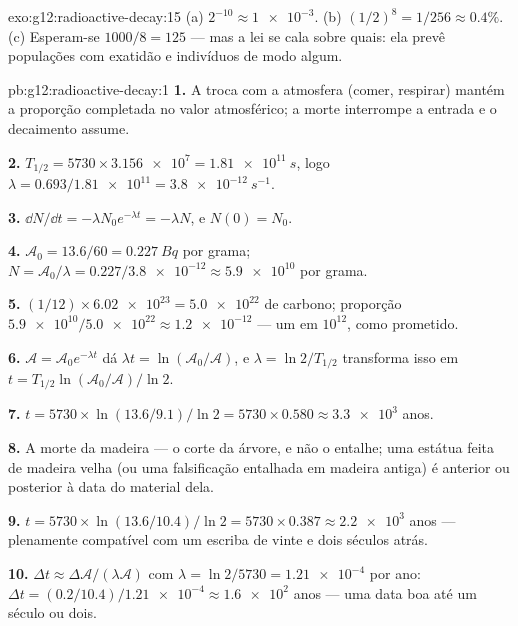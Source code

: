 \begin{solution}{exo:g12:radioactive-decay:15}
(a) $2^{-10} \approx \num{1e-3}$. (b) $(1/2)^8 = 1/256 \approx 0.4\%$.
(c) Esperam-se $1000/8 = 125$ --- mas a lei se cala sobre quais: ela
prevê populações com exatidão e indivíduos de modo algum.
\end{solution}

\begin{solution}{pb:g12:radioactive-decay:1}
\textbf{1.} A troca com a atmosfera (comer, respirar) mantém a proporção
completada no valor atmosférico; a morte interrompe a entrada e o
decaimento assume.

\textbf{2.} $T_{1/2} = \num{5730} \times \num{3.156e7} =
\qty{1.81e11}{s}$, logo $\lambda = 0.693/\num{1.81e11} =
\qty{3.8e-12}{s^{-1}}$.

\textbf{3.} $\dd N/\dd t = -\lambda N_0 e^{-\lambda t} = -\lambda N$, e
$N(0) = N_0$.

\textbf{4.} $\mathcal A_0 = 13.6/60 = \qty{0.227}{Bq}$ por grama;
$N = \mathcal A_0/\lambda = 0.227/\num{3.8e-12} \approx \num{5.9e10}$
 por grama.

\textbf{5.} $(1/12) \times \num{6.02e23} = \num{5.0e22}$  de
carbono; proporção $\num{5.9e10}/\num{5.0e22} \approx \num{1.2e-12}$ ---
um em $10^{12}$, como prometido.

\textbf{6.} $\mathcal A = \mathcal A_0 e^{-\lambda t}$ dá
$\lambda t = \ln(\mathcal A_0/\mathcal A)$, e
$\lambda = \ln 2/T_{1/2}$ transforma isso em
$t = T_{1/2}\ln(\mathcal A_0/\mathcal A)/\ln 2$.

\textbf{7.} $t = \num{5730} \times \ln(13.6/9.1)/\ln 2 =
\num{5730} \times 0.580 \approx \num{3.3e3}$ anos.

\textbf{8.} A morte da madeira --- o corte da árvore, e não o entalhe;
uma estátua feita de madeira velha (ou uma falsificação entalhada em
madeira antiga) é anterior ou posterior à data do material dela.

\textbf{9.} $t = \num{5730} \times \ln(13.6/10.4)/\ln 2 =
\num{5730} \times 0.387 \approx \num{2.2e3}$ anos --- plenamente
compatível com um escriba de vinte e dois séculos atrás.

\textbf{10.} $\Delta t \approx \Delta\mathcal A/(\lambda\mathcal A)$ com
$\lambda = \ln 2/5730 = \num{1.21e-4}$ por ano:
$\Delta t = (0.2/10.4)/\num{1.21e-4} \approx \num{1.6e2}$ anos --- uma
data boa até um século ou dois.


\end{solution}
